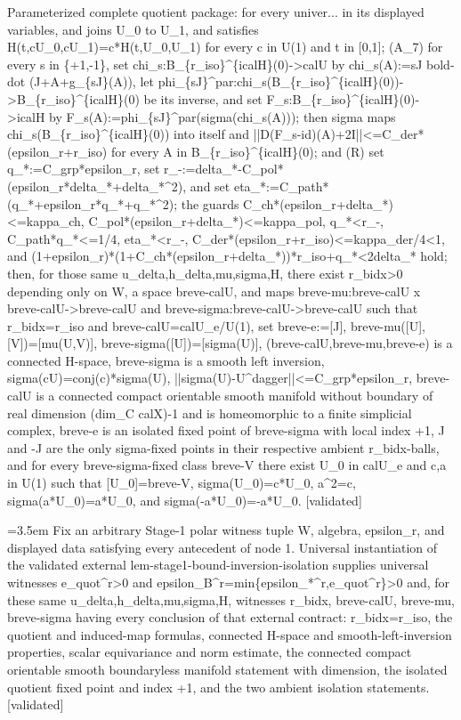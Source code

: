 \documentclass{article}
\newcommand{\step}[1]{\par\noindent\hangindent=3.5em\hangafter=1%
  \makebox[3.5em][l]{\textbf{#1.}}}
\newcommand{\steptag}[1]{\hfill{\small\textsf{[#1]}}}
\begin{document}
\begin{proofbox}{Parameterized complete quotient package: for every univer...}
in its displayed variables, and joins U\_0 to U\_1, and satisfies H(t,cU\_0,cU\_1)=c*H(t,U\_0,U\_1) for every c in U(1) and t in [0,1]; (A\_7) for every s in \{+1,-1\}, set chi\_s:B\_\{r\_iso\}\textasciicircum{}\{icalH\}(0)->calU by chi\_s(A):=sJ bold-dot (J+A+g\_\{sJ\}(A)), let phi\_\{sJ\}\textasciicircum{}par:chi\_s(B\_\{r\_iso\}\textasciicircum{}\{icalH\}(0))->B\_\{r\_iso\}\textasciicircum{}\{icalH\}(0) be its inverse, and set F\_s:B\_\{r\_iso\}\textasciicircum{}\{icalH\}(0)->icalH by F\_s(A):=phi\_\{sJ\}\textasciicircum{}par(sigma(chi\_s(A))); then sigma maps chi\_s(B\_\{r\_iso\}\textasciicircum{}\{icalH\}(0)) into itself and ||D(F\_s-id)(A)+2I||<=C\_der*(epsilon\_r+r\_iso) for every A in B\_\{r\_iso\}\textasciicircum{}\{icalH\}(0); and (R) set q\_*:=C\_grp*epsilon\_r, set r\_-:=delta\_*-C\_pol*(epsilon\_r*delta\_*+delta\_*\textasciicircum{}2), and set eta\_*:=C\_path*(q\_*+epsilon\_r*q\_*+q\_*\textasciicircum{}2); the guards C\_ch*(epsilon\_r+delta\_*)<=kappa\_ch, C\_pol*(epsilon\_r+delta\_*)<=kappa\_pol, q\_*<r\_-, C\_path*q\_*<=1/4, eta\_*<r\_-, C\_der*(epsilon\_r+r\_iso)<=kappa\_der/4<1, and (1+epsilon\_r)*(1+C\_ch*(epsilon\_r+delta\_*))*r\_iso+q\_*<2delta\_* hold; then, for those same u\_delta,h\_delta,mu,sigma,H, there exist r\_bidx>0 depending only on W, a space breve-calU, and maps breve-mu:breve-calU x breve-calU->breve-calU and breve-sigma:breve-calU->breve-calU such that r\_bidx=r\_iso and breve-calU=calU\_e/U(1), set breve-e:=[J], breve-mu([U],[V])=[mu(U,V)], breve-sigma([U])=[sigma(U)], (breve-calU,breve-mu,breve-e) is a connected H-space, breve-sigma is a smooth left inversion, sigma(cU)=conj(c)*sigma(U), ||sigma(U)-U\textasciicircum{}dagger||<=C\_grp*epsilon\_r, breve-calU is a connected compact orientable smooth manifold without boundary of real dimension (dim\_C calX)-1 and is homeomorphic to a finite simplicial complex, breve-e is an isolated fixed point of breve-sigma with local index +1, J and -J are the only sigma-fixed points in their respective ambient r\_bidx-balls, and for every breve-sigma-fixed class breve-V there exist U\_0 in calU\_e and c,a in U(1) such that [U\_0]=breve-V, sigma(U\_0)=c*U\_0, a\textasciicircum{}2=c, sigma(a*U\_0)=a*U\_0, and sigma(-a*U\_0)=-a*U\_0. \steptag{validated} \\[6pt]
\step{1.1} Fix an arbitrary Stage-1 polar witness tuple W, algebra, epsilon\_r, and displayed data satisfying every antecedent of node 1. Universal instantiation of the validated external lem-stage1-bound-inversion-isolation supplies universal witnesses e\_quot\textasciicircum{}r>0 and epsilon\_B\textasciicircum{}r=min\{epsilon\_*\textasciicircum{}r,e\_quot\textasciicircum{}r\}>0 and, for these same u\_delta,h\_delta,mu,sigma,H, witnesses r\_bidx, breve-calU, breve-mu, breve-sigma having every conclusion of that external contract: r\_bidx=r\_iso, the quotient and induced-map formulas, connected H-space and smooth-left-inversion properties, scalar equivariance and norm estimate, the connected compact orientable smooth boundaryless manifold statement with dimension, the isolated quotient fixed point and index +1, and the two ambient isolation statements. \steptag{validated} \\[4pt]

\end{proofbox}
\end{document}
